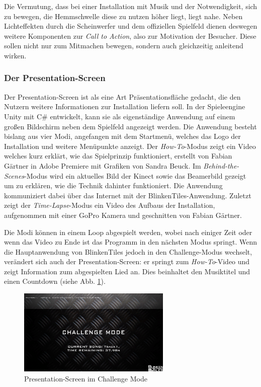 \label{ssec:CtA}

Die Vermutung, dass bei einer Installation mit Musik und der Notwendigkeit, sich zu bewegen, die Hemmschwelle diese zu nutzen höher liegt, liegt nahe. Neben Lichteffekten durch die Scheinwerfer und dem offiziellen Spielfeld dienen deswegen weitere Komponenten zur \textit{Call to Action}, also zur Motivation der Besucher. Diese sollen nicht nur zum Mitmachen bewegen, sondern auch gleichzeitig anleitend wirken.

\subsubsection{Der Presentation-Screen}

Der Presentation-Screen ist als eine Art Präsentationsfläche gedacht, die den Nutzern weitere Informationen zur Installation liefern soll. In der Spieleengine Unity mit C\# entwickelt, kann sie als eigenständige Anwendung auf einem großen Bildschirm neben dem Spielfeld angezeigt werden. Die Anwendung besteht bislang aus vier Modi, angefangen mit dem Startmenü, welches das Logo der Installation und weitere Menüpunkte anzeigt. Der \textit{How-To}-Modus zeigt ein Video welches kurz erklärt, wie das Spielprinzip funktioniert, erstellt von Fabian Gärtner in Adobe Premiere mit Grafiken von Sandra Beuck. Im \textit{Behind-the-Scenes}-Modus wird ein aktuelles Bild der Kinect sowie das Beamerbild gezeigt um zu erklären, wie die Technik dahinter funktioniert. Die Anwendung kommuniziert dabei über das Internet mit der BlinkenTiles-Anwendung. Zuletzt zeigt der \textit{Time-Lapse}-Modus ein Video des Aufbaus der Installation, aufgenommen mit einer GoPro Kamera und geschnitten von Fabian Gärtner.

Die Modi können in einem Loop abgespielt werden, wobei nach einiger Zeit oder wenn das Video zu Ende ist das Programm in den nächsten Modus springt. Wenn die Hauptanwendung von BlinkenTiles jedoch in den Challenge-Modus wechselt, verändert sich auch der Presentation-Screen: er springt zum \textit{How-To}-Video und zeigt Information zum abgespielten Lied an. Dies beinhaltet den Musiktitel und einen Countdown (siehe Abb. \ref{fig:PresScreen}).

\begin{figure}[htbp]
	\centering
		\includegraphics[width=0.65\textwidth]{images/PresScreen}
	\caption{Presentation-Screen im Challenge Mode}
	\label{fig:PresScreen}
\end{figure}

